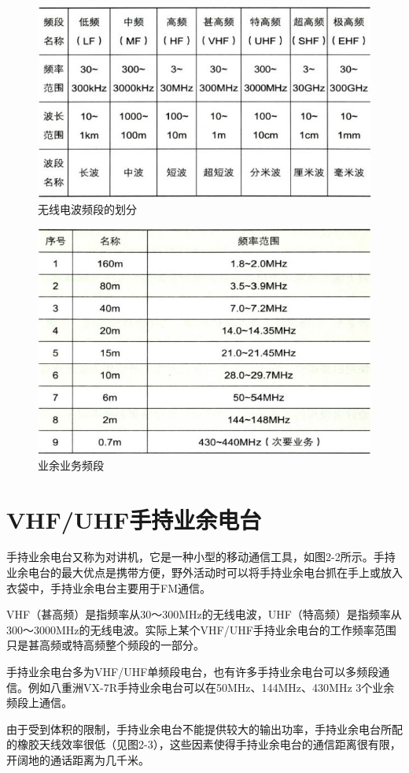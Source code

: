 \documentclass[12pt,UTF8]{ctexbook}
\begin{document}
\begin{figure}[htbp]
	\centering
	\includegraphics[width=0.7\linewidth]{17}
	\caption{无线电波频段的划分}
	\label{fig:1}
\end{figure}

\begin{figure}[htbp]
	\centering
	\includegraphics[width=0.7\linewidth]{18}
	\caption{业余业务频段}
	\label{fig:1}
\end{figure}

\section{VHF/UHF手持业余电台}

手持业余电台又称为对讲机，它是一种小型的移动通信工具，如图2-2所示。手持业余电台的最大优点是携带方便，野外活动时可以将手持业余电台抓在手上或放入衣袋中，手持业余电台主要用于FM通信。

VHF（甚高频）是指频率从30～300MHz的无线电波，UHF（特高频）是指频率从300～3000MHz的无线电波。实际上某个VHF/UHF手持业余电台的工作频率范围只是甚高频或特高频整个频段的一部分。

手持业余电台多为VHF/UHF单频段电台，也有许多手持业余电台可以多频段通信。例如八重洲VX-7R手持业余电台可以在50MHz、144MHz、430MHz 3个业余频段上通信。

由于受到体积的限制，手持业余电台不能提供较大的输出功率，手持业余电台所配的橡胶天线效率很低（见图2-3），这些因素使得手持业余电台的通信距离很有限，开阔地的通话距离为几千米。
\end{document}
